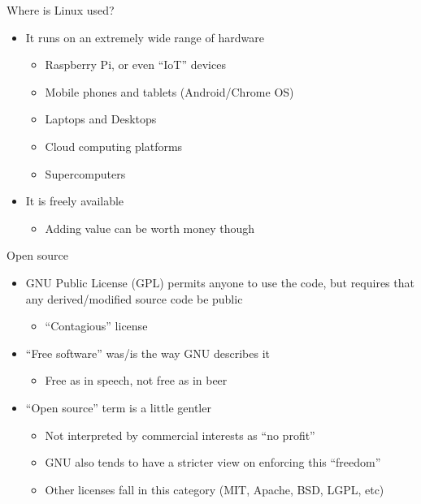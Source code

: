\documentclass[aspectratio=169, notes]{beamer}
\begin{document}
\begin{frame}{Where is Linux used?}
	\begin{itemize}
	\item It runs on an extremely wide range of hardware
		\begin{itemize}
		\item Raspberry Pi, or even ``IoT'' devices
		\item Mobile phones and tablets (Android/Chrome OS)
		\item Laptops and Desktops
		\item Cloud computing platforms
		\item Supercomputers
		\end{itemize}
	\item It is freely available
		\begin{itemize}
		\item Adding value can be worth money though
		\end{itemize}
	\end{itemize}
\end{frame}

\begin{frame}{Open source}
	\begin{itemize}
	\item GNU Public License (GPL) permits anyone to use the code, but requires that any derived/modified source code be public
		\begin{itemize}
		\item ``Contagious'' license
		\end{itemize}
	\item ``Free software'' was/is the way GNU describes it
		\begin{itemize}
		\item Free as in speech, not free as in beer
		\end{itemize}
	\item ``Open source'' term is a little gentler
		\begin{itemize}
		\item Not interpreted by commercial interests as ``no profit''
		\item GNU also tends to have a stricter view on enforcing this ``freedom''
		\item Other licenses fall in this category (MIT, Apache, BSD, LGPL, etc)
		\end{itemize}
	\end{itemize}
\end{frame}
\end{document}
